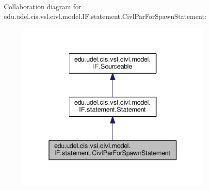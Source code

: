 Collaboration diagram for edu.\+udel.\+cis.\+vsl.\+civl.\+model.\+I\+F.\+statement.\+Civl\+Par\+For\+Spawn\+Statement\+:
\nopagebreak
\begin{figure}[H]
\begin{center}
\leavevmode
\includegraphics[width=277pt]{interfaceedu_1_1udel_1_1cis_1_1vsl_1_1civl_1_1model_1_1IF_1_1statement_1_1CivlParForSpawnStatement__coll__graph}
\end{center}
\end{figure}
